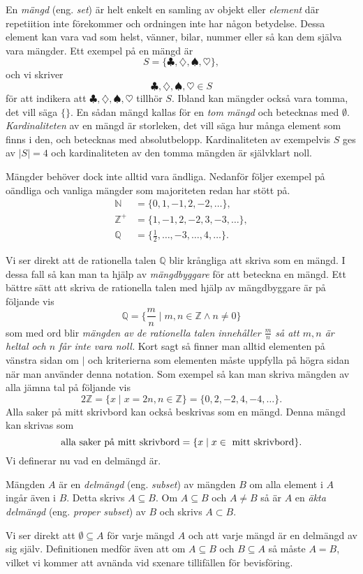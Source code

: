 \documentclass{article}
\theoremstyle{definition}
\begin{document}
En \textit{mängd} (eng. \textit{set}) är helt enkelt en samling av objekt eller \textit{element} där repetiition 
inte förekommer och ordningen inte har någon betydelse.
Dessa element kan vara vad som helst, vänner, bilar, nummer eller så kan dem själva vara mängder. 
Ett exempel på en mängd är 
\[S = \{\clubsuit, \diamondsuit, \spadesuit, \heartsuit\},\]
och vi skriver
\[\clubsuit, \diamondsuit, \spadesuit, \heartsuit \in S\]
för att indikera att $\clubsuit, \diamondsuit, \spadesuit, \heartsuit$ tillhör $S$.
Ibland kan mängder också vara tomma, det vill säga $\{ \}$. En sådan mängd kallas för en \textit{tom mängd} och 
betecknas med $\emptyset$. \textit{Kardinaliteten} av en mängd är storleken, det vill säga 
hur många element som finns i den, och betecknas med absolutbelopp. 
Kardinaliteten av exempelvis $S$ ges av
$|S| = 4$ och kardinaliteten av den tomma mängden är självklart noll. 

Mängder behöver dock inte alltid vara ändliga. 
Nedanför följer exempel på oändliga och vanliga mängder som majoriteten redan har 
stött på.
\begin{align*}
    \mathbb{N} & = \{0, 1, -1, 2, -2, \ldots \}, \\
    \mathbb{Z^+} & = \{1, -1, 2, -2, 3, -3, \ldots \}, \\
    \mathbb{Q} & = \{\frac{1}{2}, \ldots, -3, \ldots, 4, \ldots \}.
\end{align*}

Vi ser direkt att de rationella talen $\mathbb{Q}$ blir krångliga att skriva som en mängd. I 
dessa fall så kan man ta hjälp av \textit{mängdbyggare} för att beteckna en mängd. 
Ett bättre sätt 
att skriva de rationella talen med hjälp av mängdbyggare är på följande vis
\[ \mathbb{Q} = \biggl\{ \frac{m}{n} \; \biggl| \; m, n \in \mathbb{Z} \land n \neq 0 \biggl\}\]
som med ord blir \textit{mängden av de rationella talen innehåller $\frac{m}{n}$ så att $m, n$ är heltal och 
$n$ får inte vara noll.} Kort sagt så finner man
alltid elementen på vänstra sidan om $|$ och kriterierna som elementen måste uppfylla på högra sidan när man 
använder denna notation. Som exempel så kan man skriva mängden av alla jämna tal på följande vis
\[2 \mathbb{Z} = \{x \; | \; x = 2n, n \in \mathbb{Z}\} = \{0, 2, -2, 4, -4, \ldots\}.\]
Alla saker på mitt skrivbord kan också beskrivas som en mängd. Denna mängd kan skrivas som
\[ \textnormal{alla saker på mitt skrivbord} = \{x \; | \; x \in \textnormal{ mitt skrivbord}\}. \]
Vi definerar nu vad en delmängd är.

\begin{mydef}{}{}
  Mängden $A$ är en \textit{delmängd} (eng. \textit{subset}) av mängden $B$ om alla element i $A$ ingår även i $B$. Detta skrivs 
  $A \subseteq B$. Om $A \subseteq B$ och $A \neq B$ så är $A$ en \textit{äkta delmängd} (eng. \textit{proper subset}) av $B$ och skrivs
  $A \subset B$.
\end{mydef}
Vi ser direkt att $\emptyset \subseteq A$ för varje mängd $A$ och att varje mängd är en delmängd av 
sig själv. Definitionen medför även att om 
$A \subseteq B$ och $B \subseteq A$ så måste $A = B$, vilket vi kommer att avnända vid sxenare tillifällen för bevisföring. 
\end{document}
